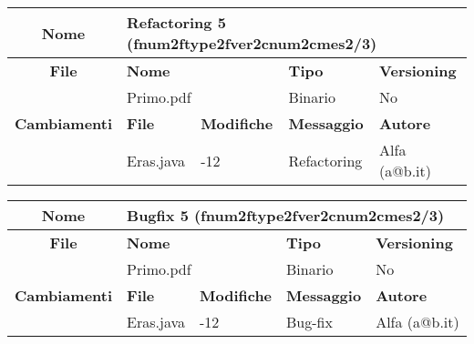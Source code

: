 \begin{table}[ht]
\footnotesize
\begin{tabular}{|c|p{2.5cm}|p{2cm}|p{2.5cm}|p{2.5cm}|}
  \hline
  \textbf{Nome}	& \multicolumn{4}{l|}{Refactoring 5 (fnum2ftype2fver2cnum2cmes2/3)} 									\\
  \hline
  \rowcolor{lightgray}\textbf{File} 		& \multicolumn{2}{l|}{\textbf{Nome}}		& \textbf{Tipo}		& \textbf{Versioning} 		\\
						\cline{2-5}
						& \multicolumn{2}{l|}{Primo.pdf}		& Binario		& No				\\
  \hline
  \rowcolor{lightgray}\textbf{Cambiamenti}	& \textbf{File}		&\textbf{Modifiche}	& \textbf{Messaggio}	& \textbf{Autore}		\\
						\cline{2-5}
						& Eras.java		& -12	 		& Refactoring		& Alfa (a@b.it)			\\
						
  \hline
\end{tabular}
\end{table}


\begin{table}[ht]
\footnotesize
\begin{tabular}{|c|p{2.5cm}|p{2cm}|p{2.5cm}|p{2.5cm}|}
  \hline
  \textbf{Nome}	& \multicolumn{4}{l|}{Bugfix 5 (fnum2ftype2fver2cnum2cmes2/3)} 										\\
  \hline
  \rowcolor{lightgray}\textbf{File} 		& \multicolumn{2}{l|}{\textbf{Nome}}		& \textbf{Tipo}		& \textbf{Versioning} 		\\
						\cline{2-5}
						& \multicolumn{2}{l|}{Primo.pdf}		& Binario		& No				\\
  \hline
  \rowcolor{lightgray}\textbf{Cambiamenti}	& \textbf{File}		&\textbf{Modifiche}	& \textbf{Messaggio}	& \textbf{Autore}		\\
						\cline{2-5}
						& Eras.java		& -12	 		& Bug-fix		& Alfa (a@b.it)			\\
						
  \hline
\end{tabular}
\end{table}

